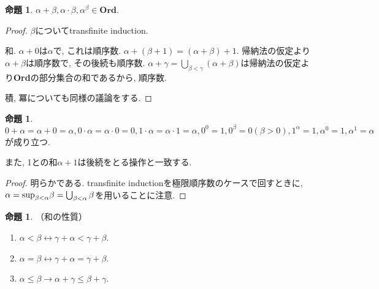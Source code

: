 \documentclass[a4paper, twoside]{bxjsarticle}
\theoremstyle{definition}
\newtheorem{prop}[thm]{命題}
\begin{document}
        \begin{prop}
            $\alpha + \beta, \alpha \cdot \beta, \alpha^\beta \in \textbf{Ord}$.
        \end{prop}
        \begin{proof}
            $\beta$についてtransfinite induction.
            
            和. $\alpha+0$は$\alpha$で, これは順序数. $\alpha+(\beta+1)=(\alpha+\beta)+1$. 帰納法の仮定より$\alpha+\beta$は順序数で, その後続も順序数. $\alpha+\gamma = \bigcup_{\beta<\gamma}(\alpha+\beta)$は帰納法の仮定より\textbf{Ord}の部分集合の和であるから, 順序数.
            
            積, 冪についても同様の議論をする.
        \end{proof}
        \begin{prop}
            $0+\alpha=\alpha+0=\alpha, 0\cdot\alpha=\alpha\cdot0=0, 1\cdot\alpha=\alpha\cdot1=\alpha, 0^0=1, 0^\beta=0(\beta>0), 1^\alpha=1, \alpha^0=1, \alpha^1=\alpha$が成り立つ.
            
            また, 1との和$\alpha+1$は後続をとる操作と一致する.
        \end{prop}
        \begin{proof}
            明らかである. transfinite inductionを極限順序数のケースで回すときに, $\alpha = {\rm sup}_{\beta<\alpha}\beta = \bigcup_{\beta<\alpha}\beta$を用いることに注意.
        \end{proof}
        \begin{prop}
            （和の性質）
        
            \begin{enumerate}
                \item $\alpha<\beta \leftrightarrow \gamma+\alpha<\gamma+\beta$.
                \item $\alpha=\beta \leftrightarrow \gamma+\alpha=\gamma+\beta$.
                \item $\alpha\leq\beta \to \alpha+\gamma\leq\beta+\gamma$.
            \end{enumerate}
        \end{prop}
\end{document}
